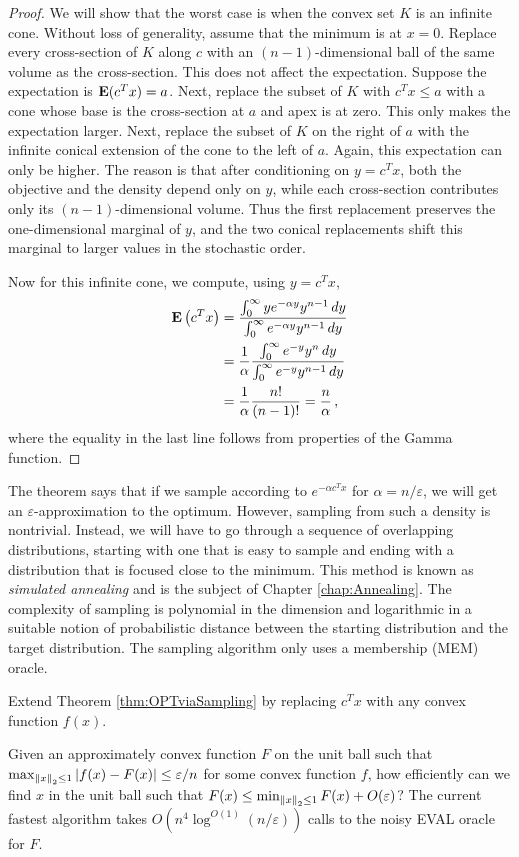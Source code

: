 \begin{proof}
We will show that the worst case is when the convex set $K$ is an
infinite cone. Without loss of generality, assume that the minimum
is at $x=0.$ Replace every cross-section of $K$ along $c$ with
an $(n-1)$-dimensional ball of the same volume as the cross-section.
This does not affect the expectation. Suppose the expectation is $\mathbf{E}(c^{T}x)=a$.
Next, replace the subset of $K$ with $c^{T}x\le a$ with a cone whose
base is the cross-section at $a$ and apex is at zero. This only makes
the expectation larger. Next, replace the subset of $K$ on the right
of $a$ with the infinite conical extension of the cone to the left
of $a$. Again, this expectation can only be higher. The reason is
that after conditioning on $y=c^{T}x$, both the objective and the
density depend only on $y$, while each cross-section contributes
only its $(n-1)$-dimensional volume. Thus the first replacement preserves
the one-dimensional marginal of $y$, and the two conical replacements
shift this marginal to larger values in the stochastic order. 

Now for this infinite cone, we compute, using $y=c^{T}x$, 
\begin{align*}
\mathbf{E}\left(c^{T}x\right) & =\frac{\int^{\infty}_{0}ye^{-\alpha y}y^{n-1}\,dy}{\int^{\infty}_{0}e^{-\alpha y}y^{n-1}\,dy}\\
 & =\frac{1}{\alpha}\frac{\int^{\infty}_{0}e^{-y}y^{n}\,dy}{\int^{\infty}_{0}e^{-y}y^{n-1}\,dy}\\
 & =\frac{1}{\alpha}\frac{n!}{(n-1)!}=\frac{n}{\alpha}\,,
\end{align*}
where the equality in the last line follows from properties of the
Gamma function.
\end{proof}
The theorem says that if we sample according to $e^{-\alpha c^{T}x}$
for $\alpha=n/\varepsilon$, we will get an $\varepsilon$-approximation
to the optimum. However, sampling from such a density is nontrivial.
Instead, we will have to go through a sequence of overlapping distributions,
starting with one that is easy to sample and ending with a distribution
that is focused close to the minimum. This method is known as \emph{simulated
annealing} and is the subject of Chapter \ref{chap:Annealing}. The
complexity of sampling is polynomial in the dimension and logarithmic
in a suitable notion of probabilistic distance between the starting
distribution and the target distribution. The sampling algorithm only
uses a membership (MEM) oracle.
\begin{xca}
Extend Theorem \ref{thm:OPTviaSampling} by replacing $c^{T}x$ with
any convex function $f(x)$.
\end{xca}

\begin{problem*}
Given an approximately convex function $F$ on the unit ball such
that $\max_{\left\Vert x\right\Vert_{2}\leq1}|f(x)-F(x)|\leq\varepsilon/n$ for some
convex function $f$, how efficiently can we find $x$ in the unit
ball such that $F(x)\leq\min_{\left\Vert x\right\Vert_{2}\leq1}F(x)+O(\varepsilon)$?
The current fastest algorithm takes $O(n^{4}\log^{O(1)}(n/\varepsilon))$
calls to the noisy EVAL oracle for $F.$ 
\end{problem*}

